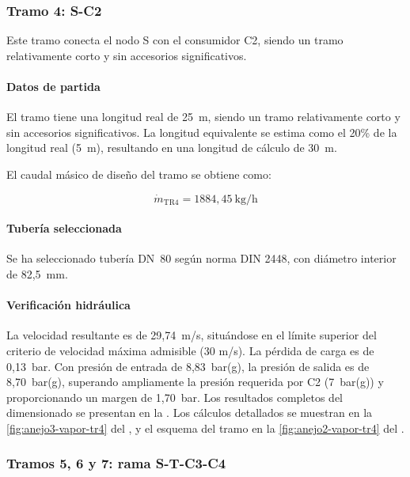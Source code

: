 \documentclass[12pt]{article}
\begin{document}
\subsubsection{Tramo 4: S-C2}
\label{subsubsec:tramo4-s-c2}

Este tramo conecta el nodo S con el consumidor C2, siendo un tramo relativamente corto y sin accesorios significativos.

\paragraph{Datos de partida}

El tramo tiene una longitud real de 25~m, siendo un tramo relativamente corto y sin accesorios significativos. La longitud equivalente se estima como el 20\% de la longitud real (5~m), resultando en una longitud de cálculo de 30~m.

El caudal másico de diseño del tramo se obtiene como:

\begin{equation}
	\dot{m}_{\text{TR4}} = 1884{,}45~\text{kg/h}
	\label{eq:caudal-tramo4}
\end{equation}

\paragraph{Tubería seleccionada}

Se ha seleccionado tubería DN~80 según norma DIN 2448, con diámetro interior de 82,5~mm.

\paragraph{Verificación hidráulica}

La velocidad resultante es de 29,74~m/s, situándose en el límite superior del criterio de velocidad máxima admisible (30 m/s). La pérdida de carga es de 0,13~bar. Con presión de entrada de 8,83~bar(g), la presión de salida es de 8,70~bar(g), superando ampliamente la presión requerida por C2 (7~bar(g)) y proporcionando un margen de 1,70~bar. Los resultados completos del dimensionado se presentan en la . Los cálculos detallados se muestran en la \autoref{fig:anejo3-vapor-tr4} del , y el esquema del tramo en la \autoref{fig:anejo2-vapor-tr4} del .

\subsubsection{Tramos 5, 6 y 7: rama S-T-C3-C4}
\label{subsubsec:tramos5-6-7}
\end{document}
